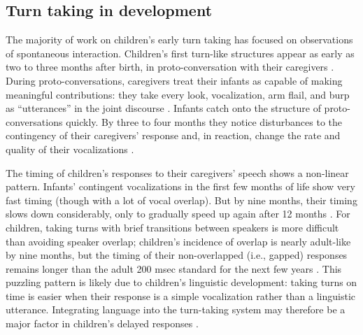 \documentclass[authoryear, 12pt]{elsarticle}
\begin{document}
\subsection*{Turn taking in development}


The majority of work on children's early turn taking has focused on observations of spontaneous interaction. Children's first turn-like structures appear as early as two to three months after birth, in proto-conversation with their caregivers \citep{bruner1975, bruner1985, snow1977}. During proto-conversations, caregivers treat their infants as capable of making meaningful contributions: they take every look, vocalization, arm flail, and burp as ``utterances'' in the joint discourse \citep{bateson1975, jaffe2001, snow1977}. Infants catch onto the structure of proto-conversations quickly. By three to four months they notice disturbances to the contingency of their caregivers' response and, in reaction, change the rate and quality of their vocalizations \citep{k-bloom1988, masataka1993, toda1993}. 


The timing of children's responses to their caregivers' speech shows a non-linear pattern. Infants' contingent vocalizations in the first few months of life show very fast timing (though with a lot of vocal overlap). But by nine months, their timing slows down considerably, only to gradually speed up again after 12 months \citep{hilbrink2015}. For children, taking turns with brief transitions between speakers is more difficult than avoiding speaker overlap; children's incidence of overlap is nearly adult-like by nine months, but the timing of their non-overlapped (i.e., gapped) responses remains longer than the adult 200 msec standard for the next few years \citep{casillas2016, garvey1984, garvey1981, ervin-tripp1979}. This puzzling pattern is likely due to children's linguistic development: taking turns on time is easier when their response is a simple vocalization rather than a linguistic utterance. Integrating language into the turn-taking system may therefore be a major factor in children's delayed responses \citep{casillas2016}.
\end{document}

